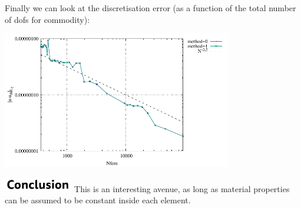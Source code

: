 Finally we can look at the discretisation error (as a function of 
the total number of dofs for commodity):
\begin{center}
\includegraphics[width=10cm]{python_codes/fieldstone_179/RESULTS/erru.pdf}
\end{center}

\includegraphics[width=3cm]{images/conclusion} 
This is an interesting avenue, as long as material properties can 
be assumed to be constant inside each element.



